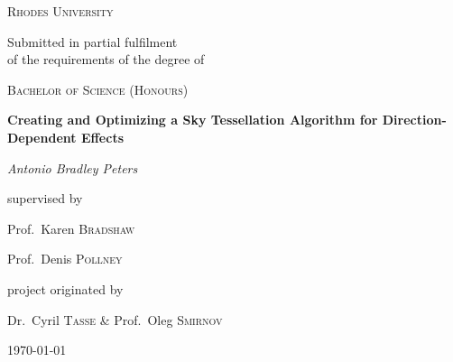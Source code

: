 \begin{titlepage}
  \centering
  {\scshape\LARGE Rhodes University \par}
  \vspace{1cm}
  {\Large Submitted in partial fulfilment\\of the requirements of the degree of \par}
  \vspace{0.5cm}
  {\scshape\Large Bachelor of Science (Honours)\par}
  \vspace{1.5cm}
  {\huge\bfseries Creating and Optimizing a Sky Tessellation Algorithm for Direction-Dependent Effects\par}
  \vspace{2cm}
  {\Large\itshape Antonio Bradley Peters\par}
  \vfill
  supervised by\par
  Prof.~Karen \textsc{Bradshaw}\par
  Prof.~Denis \textsc{Pollney}\par
  \vspace{1cm}
  project originated by\par
  Dr.~Cyril \textsc{Tasse} \& Prof.~Oleg \textsc{Smirnov}
  \vfill
  {\large \today\par}
\end{titlepage}